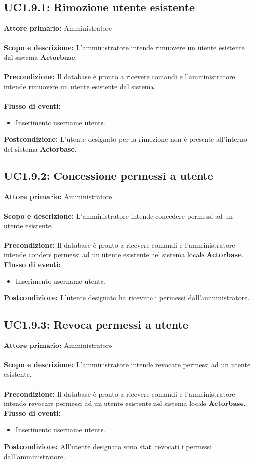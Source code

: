 \documentclass{scalatekids-article}
\begin{document}
\subsection{UC1.9.1: Rimozione utente esistente}
\textbf{Attore primario:} Amministratore\\ \\
\textbf{Scopo e descrizione:} L'amministratore intende rimuovere un utente esistente dal sistema \textbf{Actorbase}.\\ \\
\textbf{Precondizione:} Il database è pronto a ricevere comandi e l'amministratore intende rimuovere un utente esistente dal sistema.\\ \\
\textbf{Flusso di eventi:}
\begin{itemize}
\item Inserimento username utente.
\end{itemize}
\textbf{Postcondizione:} L'utente designato per la rimozione non è presente all'interno del sistema \textbf{Actorbase}.
\subsection{UC1.9.2: Concessione permessi a utente}
\textbf{Attore primario:} Amministratore\\ \\
\textbf{Scopo e descrizione:} L'amministratore intende concedere permessi ad un utente esistente.\\ \\
\textbf{Precondizione:} Il database è pronto a ricevere comandi e l'amministratore intende condere permessi ad un utente esistente nel sistema locale \textbf{Actorbase}.
\textbf{Flusso di eventi:}
\begin{itemize}
\item Inserimento username utente.
\end{itemize}
\textbf{Postcondizione:} L'utente designato ha ricevuto i permessi dall'amministratore.
\subsection{UC1.9.3: Revoca permessi a utente}
\textbf{Attore primario:} Amministratore\\ \\
\textbf{Scopo e descrizione:} L'amministratore intende revocare permessi ad un utente esistente.\\ \\
\textbf{Precondizione:} Il database è pronto a ricevere comandi e l'amministratore intende revocare permessi ad un utente esistente nel sistema locale \textbf{Actorbase}.
\textbf{Flusso di eventi:}
\begin{itemize}
\item Inserimento username utente.
\end{itemize}
\textbf{Postcondizione:} All'utente designato sono stati revocati i permessi dall'amministratore.
\end{document}
